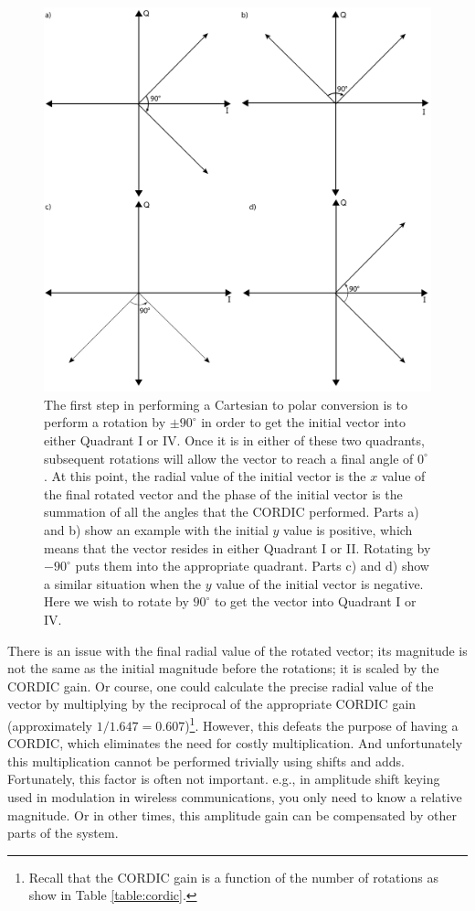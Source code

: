 \begin{figure}
\centering
\includegraphics[width=\textwidth]{images/cordic_magnitude_angle}
\caption{The first step in performing a Cartesian to polar conversion is to perform a rotation by $\pm 90^{\circ}$ in order to get the initial vector into either Quadrant I or IV. Once it is in either of these two quadrants, subsequent rotations will allow the vector to reach a final angle of $0^{\circ}$. At this point, the radial value of the initial vector is the $x$ value of the final rotated vector and the phase of the initial vector is the summation of all the angles that the CORDIC performed. Parts a) and b) show an example with the initial $y$ value is positive, which means that the vector resides in either Quadrant I or II. Rotating by $-90^{\circ}$ puts them into the appropriate quadrant. Parts c) and d) show a similar situation when the $y$ value of the initial vector is negative. Here we wish to rotate by $90^{\circ}$ to get the vector into Quadrant I or IV. }
\label{fig:rotate90}
\end{figure}

There is an issue with the final radial value of the rotated vector; its magnitude is not the same as the initial magnitude before the rotations; it is scaled by the CORDIC gain. Or course, one could calculate the precise radial value of the vector by multiplying by the reciprocal of the appropriate CORDIC gain (approximately $1/1.647 = 0.607$)\footnote{Recall that the CORDIC gain is a function of the number of rotations as show in Table \ref{table:cordic}.}. However, this defeats the purpose of having a CORDIC, which eliminates the need for costly multiplication. And unfortunately this multiplication cannot be performed trivially using shifts and adds. Fortunately, this factor is often not important. e.g., in amplitude shift keying used in modulation in wireless communications, you only need to know a relative magnitude.  Or in other times, this amplitude gain can be compensated by other parts of the system.


